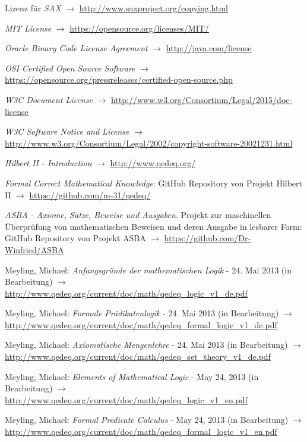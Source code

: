 \documentclass[english,ngerman,parskip=half,headsepline,footsepline]{scrreprt}
\begin{document}
\begin{flushleft}
\begin{thebibliography}{12}
			Lizenz für \emph{SAX} $\rightarrow$ \url{http://www.saxproject.org/copying.html}

			\emph{MIT License} $\rightarrow$ \url{https://opensource.org/licenses/MIT/}

			\emph{Oracle Binary Code License Agreement} $\rightarrow$ \url{http://java.com/license}

			\emph{OSI Certified Open Source Software} $\rightarrow$ \url{https://opensource.org/pressreleases/certified-open-source.php}

			\emph{W3C Document License} $\rightarrow$ \url{http://www.w3.org/Consortium/Legal/2015/doc-license}

			\emph{W3C Software Notice and License} $\rightarrow$ \url{http://www.w3.org/Consortium/Legal/2002/copyright-software-20021231.html}

			\emph{Hilbert II - Introduction} $\rightarrow$ \url{http://www.qedeq.org/}

			\emph{Formal Correct Mathematical Knowledge}: GitHub Repository von Projekt Hilbert II $\rightarrow$ \url{https://github.com/m-31/qedeq/}

			\emph{ASBA - Axiome, Sätze, Beweise und Ausgaben}. Projekt zur maschinellen Überprüfung von mathematischen Beweisen und deren Ausgabe in lesbarer Form: GitHub Repository von Projekt ASBA $\rightarrow$ \url{https://github.com/Dr-Winfried/ASBA}

			Meyling, Michael: \emph{Anfangsgründe der mathematischen Logik} - 24. Mai 2013 (in Bearbeitung) $\rightarrow$ \url{http://www.qedeq.org/current/doc/math/qedeq_logic_v1_de.pdf}

			Meyling, Michael: \emph{Formale Prädikatenlogik} - 24. Mai 2013 (in Bearbeitung) $\rightarrow$ \url{http://www.qedeq.org/current/doc/math/qedeq_formal_logic_v1_de.pdf}

			Meyling, Michael: \emph{Axiomatische Mengenlehre} - 24. Mai 2013 (in Bearbeitung) $\rightarrow$ \url{http://www.qedeq.org/current/doc/math/qedeq_set_theory_v1_de.pdf}

			Meyling, Michael: \emph{Elements of Mathematical Logic} - May 24, 2013 (in Bearbeitung) $\rightarrow$ \url{http://www.qedeq.org/current/doc/math/qedeq_logic_v1_en.pdf}

			Meyling, Michael: \emph{Formal Predicate Calculus} - May 24, 2013 (in Bearbeitung) $\rightarrow$ \url{http://www.qedeq.org/current/doc/math/qedeq_formal_logic_v1_en.pdf}


\end{thebibliography}
\end{flushleft}
\end{document}
